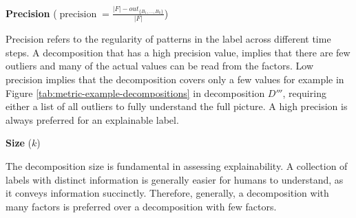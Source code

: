 \textbf{Precision} ($\operatorname{precision} = \frac{|F| - out_{\{B_1,\dots,B_k\}}}{|F|}$)

Precision refers to the regularity of patterns in the label across different time steps.
A decomposition that has a high precision value, implies that there are few outliers and many of the actual values can be read from the factors.
Low precision implies that the decomposition covers only a few values for example in Figure \ref{tab:metric-example-decompositions} in decomposition $D'''$, requiring either a list of all outliers to fully understand the full picture.
A high precision is always preferred for an explainable label. 

\textbf{Size} ($k$)

The decomposition size is fundamental in assessing explainability.
A collection of labels with distinct information is generally easier for humans to understand, as it conveys information succinctly.
Therefore, generally, a decomposition with many factors is preferred over a decomposition with few factors.

